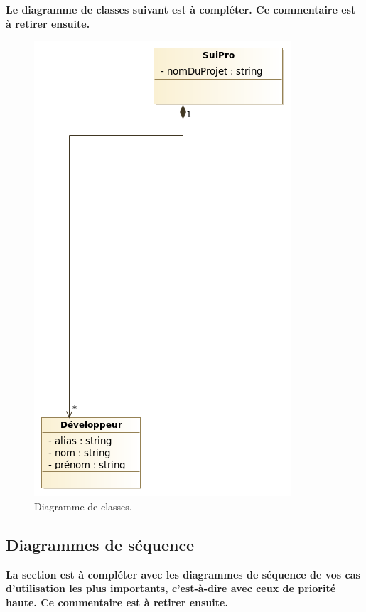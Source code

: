 \documentclass[11pt,article]{article}
\begin{document}
{\noindent\color{red}\textbf{Le diagramme de classes suivant est à
    compléter. Ce commentaire est à retirer ensuite.}}

\begin{figure}[!ht]
\begin{center}
\includegraphics[scale=0.6]{Diagrammes/suipro_uml_diag_classes}
\caption{Diagramme de classes.}
\end{center}
\label{umlet_diag_classes}
\end{figure}

\newpage

\subsection{Diagrammes de séquence}

{\noindent\color{red}\textbf{La section est à compléter avec les
    diagrammes de séquence de vos cas d'utilisation les plus
    importants, c'est-à-dire avec ceux de priorité haute. Ce
    commentaire est à retirer ensuite.}}
\end{document}
